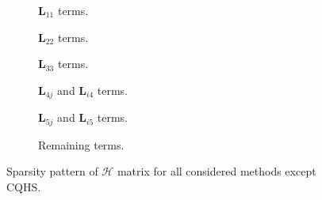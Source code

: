 \begin{figure}

\centering

\begin{subfigure}[b]{0.45\textwidth}

\vspace{-5mm}
\caption{$\bm{L}_{11}$ terms.}
\end{subfigure}
\begin{subfigure}[b]{0.45\textwidth}

\vspace{-5mm}
\caption{$\bm{L}_{22}$ terms.}
\end{subfigure}

\begin{subfigure}[b]{0.45\textwidth}

\vspace{-5mm}
\caption{$\bm{L}_{33}$ terms.}
\end{subfigure}
\begin{subfigure}[b]{0.45\textwidth}

\vspace{-5mm}
\caption{$\bm{L}_{4j}$ and $\bm{L}_{i4}$ terms.}
\end{subfigure}

\begin{subfigure}[b]{0.45\textwidth}

\vspace{-5mm}
\caption{$\bm{L}_{5j}$ and $\bm{L}_{i5}$ terms.}
\end{subfigure}
\begin{subfigure}[b]{0.45\textwidth}

\vspace{-5mm}
\caption{Remaining terms.}
\end{subfigure}

\caption{Sparsity pattern of $\mathcal{H}$ matrix for all considered methods except CQHS.\label{fig:figsparsityHSS}}
\end{figure}